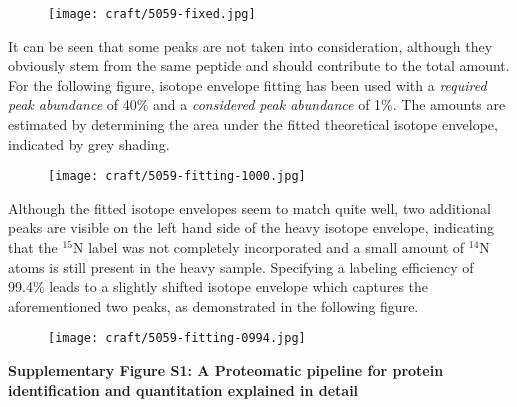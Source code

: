 \documentclass[11pt,letterpaper]{article}
\begin{document}
\begin{figure}[h]
\texttt{[image: craft/5059-fixed.jpg]}
\end{figure}

It can be seen that some peaks are not taken into consideration, although they
obviously stem from the same peptide and should contribute to the total amount.
For the following figure, isotope envelope fitting has been used with a 
{\em required peak abundance} of 40\% and a {\em considered peak abundance}
of 1\%. The amounts are estimated by determining the area under the fitted
theoretical isotope envelope, indicated by grey shading.

\begin{figure}[h]
\texttt{[image: craft/5059-fitting-1000.jpg]}
\end{figure}

Although the fitted isotope envelopes seem to match quite well, two additional
peaks are visible on the left hand side of the heavy isotope envelope, 
indicating that the $^{15}$N label was not completely incorporated and a small
amount of $^{14}$N atoms is still present in the heavy sample. Specifying
a labeling efficiency of 99.4\% leads to a slightly shifted isotope envelope
which captures the aforementioned two peaks, as demonstrated in the following 
figure.

\begin{figure}[h]
\texttt{[image: craft/5059-fitting-0994.jpg]}
\end{figure}

\clearpage  

{\bf \LARGE Supplementary Figure S1: A Proteomatic pipeline for protein 
identification and quantitation explained in detail}
\end{document}
